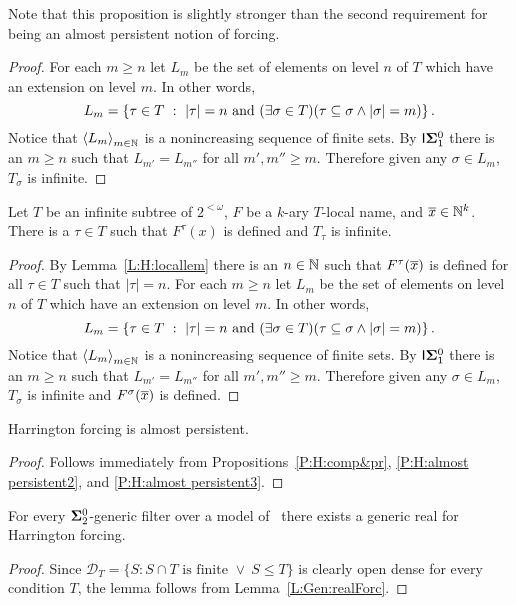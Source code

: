 Note that this proposition is slightly stronger
than the second requirement for being
an almost persistent notion of forcing.

\begin{proof}
For each $m\geq n$ let $L_m$ be the set of elements on level $n$ of $T$
which have an extension on level $m$.
In other words,
$$L_m=\left\{\tau\in T\ :\ |\tau|=n\text{ and }(\exists\sigma\in T)(\tau\subseteq\sigma \land |\sigma|=m)\right\}.$$
Notice that $\left\langle L_m\right\rangle_{m\in\mathbb{N}}$ is a nonincreasing sequence of finite sets.
By $\mathsf{I}{\mathbf{\Sigma}^0_1}$ there is an $m\geq n$
such that $L_{m'}=L_{m''}$ for all $m',m''\geq m$.
Therefore given any $\sigma\in L_m$,
$T_\sigma$ is infinite.
\end{proof}

\begin{prop}[\RCAo]\label{P:H:almost persistent3}
Let $T$ be an infinite subtree of $2^{<\omega}$,
$F$ be a $k$-ary $T$-local name, and $\overline{x}\in\mathbb{N}^k$.
There is a $\tau\in T$ such that $F^\tau(x)$ is defined
and $T_\tau$ is infinite.
\end{prop}
\begin{proof}
By Lemma~\ref{L:H:locallem} there is an $n\in\mathbb{N}$ such that
$F^\tau(\overline{x})$ is defined for all $\tau\in T$ such that $|\tau|=n$.
For each $m\geq n$ let $L_m$ be the set of elements on level $n$ of $T$
which have an extension on level $m$.
In other words,
$$L_m=\left\{\tau\in T\ :\ |\tau|=n\text{ and }(\exists\sigma\in T)(\tau\subseteq\sigma \land |\sigma|=m)\right\}.$$
Notice that $\left\langle L_m\right\rangle_{m\in\mathbb{N}}$ is a nonincreasing sequence of finite sets.
By $\mathsf{I}{\mathbf{\Sigma}^0_1}$ there is an $m\geq n$
such that $L_{m'}=L_{m''}$ for all $m',m''\geq m$.
Therefore given any $\sigma\in L_m$,
$T_\sigma$ is infinite and $F^\sigma(\overline{x})$ is defined.
\end{proof}

\begin{cor}[\RCAo]\label{C:H:almost persistent}
Harrington forcing is almost persistent.
\end{cor}
\begin{proof}
Follows immediately from Propositions~\ref{P:H:comp&pr}, \ref{P:H:almost persistent2}, and \ref{P:H:almost persistent3}.
\end{proof}

\begin{lem}[\RCAo]\label{L:H:realForc}
For every $\mathbf{\Sigma}^0_2$-generic filter over a model of \RCAo\
there exists a generic real for Harrington forcing.
\end{lem}
\begin{proof}
Since $\mathcal{D}_T=\{S:S\cap T\text{ is finite }\lor\ S\leq T\}$ is clearly
open dense for every condition $T$, the lemma follows from Lemma~\ref{L:Gen:realForc}.
\end{proof}

